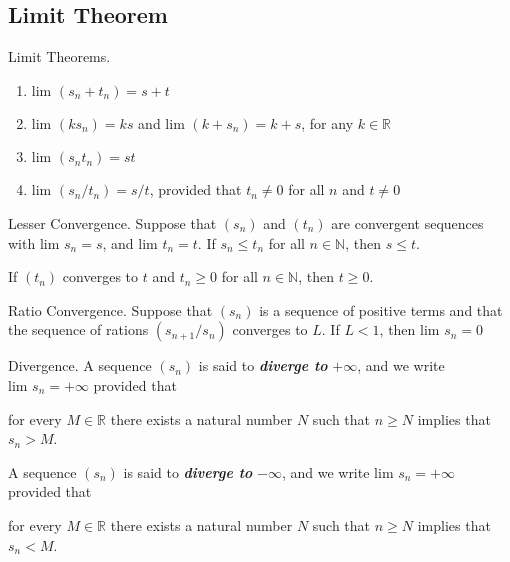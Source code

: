 \documentclass[12pt]{article}
\newcommand\lim[1]{\text{lim }#1}
\newcommand\Real{\mathbb{R}}
\newcommand\Natural{\mathbb{N}}
\begin{document}
\subsection{Limit Theorem}
\label{sec:orgf41da43}
\begin{definition}{Limit Theorems.}
  \begin{enumerate}
    \item $\lim{(s_n + t_n)} = s + t$
    \item $\lim{(ks_n)} = ks$ and $\lim{(k + s_n)} = k + s$, for any $k \in
      \Real$
    \item $\lim{(s_n t_n)} = st$
    \item $\lim{(s_n/t_n)} = s/t$, provided that $t_n \ne 0$ for all $n$ and $t
      \ne 0$
  \end{enumerate}
\end{definition}

\begin{definition}{Lesser Convergence.}
  Suppose that $(s_n)$ and $(t_n)$ are convergent sequences with $\lim{s_n} =
  s$, and $\lim{t_n} = t$. If $s_n \le t_n$ for all $n \in \Natural$, then $s
  \le t$.
\end{definition}

\begin{corollary}
  If $(t_n)$ converges to $t$ and $t_n \ge 0$ for all $n \in \Natural$, then $t
  \ge 0$.
\end{corollary}

\begin{definition}{Ratio Convergence.}
  Suppose that $(s_n)$ is a sequence of positive terms and that the sequence of
  rations $(s_{n+1} / s_n)$ converges to $L$. If $L < 1$, then $\lim{s_n} = 0$
\end{definition}

\begin{definition}{Divergence.}
  A sequence $(s_n)$ is said to \textit{\textbf{diverge to}} $+\infty$, and we
  write $\lim{s_n} = +\infty$ provided that
  \begin{center}
    for every $M \in \Real$ there exists a natural number $N$ such that $n \ge
    N$ implies that $s_n > M$.
  \end{center}

  A sequence $(s_n)$ is said to \textit{\textbf{diverge to}} $-\infty$, and we
  write $\lim{s_n} = +\infty$ provided that
  \begin{center}
    for every $M \in \Real$ there exists a natural number $N$ such that $n \ge
    N$ implies that $s_n < M$.
  \end{center}
\end{definition}
\end{document}
